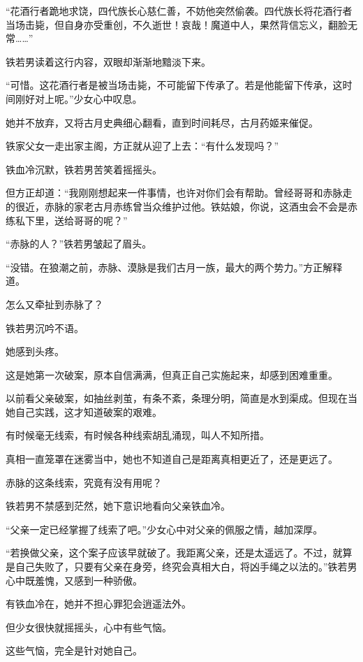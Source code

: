 
\begin{this_body}

“花酒行者跪地求饶，四代族长心慈仁善，不妨他突然偷袭。四代族长将花酒行者当场击毙，但自身亦受重创，不久逝世！哀哉！魔道中人，果然背信忘义，翻脸无常……”

铁若男读着这行内容，双眼却渐渐地黯淡下来。

“可惜。这花酒行者是被当场击毙，不可能留下传承了。若是他能留下传承，这时间刚好对上呢。”少女心中叹息。

她并不放弃，又将古月史典细心翻看，直到时间耗尽，古月药姬来催促。

铁家父女一走出家主阁，方正就从迎了上去：“有什么发现吗？”

铁血冷沉默，铁若男苦笑着摇摇头。

但方正却道：“我刚刚想起来一件事情，也许对你们会有帮助。曾经哥哥和赤脉走的很近，赤脉的家老古月赤练曾当众维护过他。铁姑娘，你说，这酒虫会不会是赤练私下里，送给哥哥的呢？”

“赤脉的人？”铁若男皱起了眉头。

“没错。在狼潮之前，赤脉、漠脉是我们古月一族，最大的两个势力。”方正解释道。

怎么又牵扯到赤脉了？

铁若男沉吟不语。

她感到头疼。

这是她第一次破案，原本自信满满，但真正自己实施起来，却感到困难重重。

以前看父亲破案，如抽丝剥茧，有条不紊，条理分明，简直是水到渠成。但现在当她自己实践，这才知道破案的艰难。

有时候毫无线索，有时候各种线索胡乱涌现，叫人不知所措。

真相一直笼罩在迷雾当中，她也不知道自己是距离真相更近了，还是更远了。

赤脉的这条线索，究竟有没有用呢？

铁若男不禁感到茫然，她下意识地看向父亲铁血冷。

“父亲一定已经掌握了线索了吧。”少女心中对父亲的佩服之情，越加深厚。

“若换做父亲，这个案子应该早就破了。我距离父亲，还是太遥远了。不过，就算是自己失败了，只要有父亲在身旁，终究会真相大白，将凶手绳之以法的。”铁若男心中既羞愧，又感到一种骄傲。

有铁血冷在，她并不担心罪犯会逍遥法外。

但少女很快就摇摇头，心中有些气恼。

这些气恼，完全是针对她自己。


\end{this_body}
